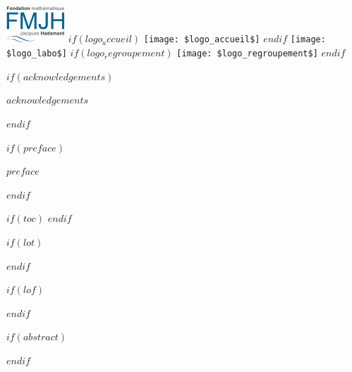 \documentclass[a4paper,12pt]{reedthesis}
\begin{document}
\vfill
\noindent
\hbox{\includegraphics[width=2.2cm]{logos/fmjh.jpg}}
\hfill
$if(logo_accueil)$
\hbox{\texttt{[image: \$logo\_accueil\$]}}
\hfill
$endif$
\hbox{\texttt{[image: \$logo\_labo\$]}}
$if(logo_regroupement)$
\hfill
\texttt{[image: \$logo\_regroupement\$]}
$endif$



\frontmatter %
\pagestyle{empty} %

$if(acknowledgements)$
  \begin{acknowledgements}
    $acknowledgements$
  \end{acknowledgements}
$endif$

$if(preface)$
  \begin{preface}
    $preface$
  \end{preface}
$endif$

$if(toc)$
  \hypersetup{linkcolor=$if(toccolor)$$toccolor$$else$black$endif$}
  \setcounter{tocdepth}{$toc-depth$}
  \tableofcontents
$endif$

$if(lot)$
  \listoftables
$endif$

$if(lof)$
  \listoffigures
$endif$

$if(abstract)$
  \begin{abstract}
    $abstract$
  \end{abstract}
$endif$
\end{document}

